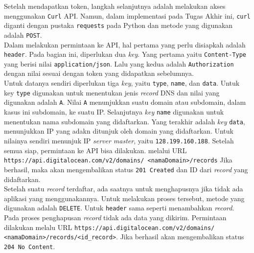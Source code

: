         	\indent Setelah mendapatkan token, langkah selanjutnya adalah melakukan akses menggunakan \texttt{Curl} API. Namun, dalam implementasi pada Tugas Akhir ini, \texttt{curl} diganti dengan pustaka \texttt{requests} pada Python dan metode yang digunakan adalah \texttt{POST}.\\
            \indent Dalam melakukan permintaan ke API, hal pertama yang perlu disiapkah adalah \texttt{header}. Pada bagian ini, diperlukan dua \textit{key}. Yang pertama yaitu \texttt{Content-Type} yang berisi nilai \texttt{application/json}. Lalu yang kedua adalah \texttt{Authorization} dengan nilai sesuai dengan token yang didapatkan sebelumnya.\\
            \indent Untuk datanya sendiri diperlukan tiga \textit{key}, yaitu \texttt{type}, \texttt{name}, dan \texttt{data}. Untuk key \texttt{type} digunakan untuk menentukan jenis \textit{record} DNS dan nilai yang digunakan adalah \texttt{A}. Nilai \texttt{A} menunjukkan suatu domain atau subdomain, dalam kasus ini subdomain, ke suatu IP. Selanjutnya \textit{key} \texttt{name} digunakan untuk menentukan nama subdomain yang didaftarkan. Yang terakhir adalah \textit{key} \texttt{data}, menunjukkan IP yang adakn ditunjuk oleh domain yang didaftarkan. Untuk nilainya sendiri menunjuk IP \textit{server master}, yaitu \texttt{128.199.160.188}. Setelah semua siap, permintaan ke API bisa dilakukan. melalui URL \texttt{https://api.digitalocean.com/v2/domains/ <namaDomain>/records} Jika berhasil, maka akan mengembalikan status \texttt{201 Created} dan  ID dari \textit{record} yang didaftarkan.\\
            \indent Setelah suatu \textit{record} terdaftar, ada saatnya untuk menghapusnya jika tidak ada aplikasi yang menggunakannya. Untuk melakukan proses tersebut, metode yang digunakan adalah \texttt{DELETE}. Untuk \texttt{header} sama seperti menambahkan \textit{record}. Pada proses penghapusan \textit{record} tidak ada data yang dikirim. Permintaan dilakukan melalu URL \texttt{https://api.digitalocean.com/v2/domains/ <namaDomain>/records/<id\_record>}. Jika berhasil akan mengembalikan status \texttt{204 No Content}.

